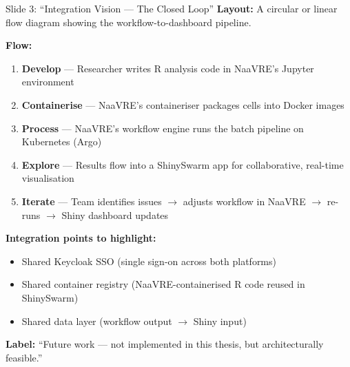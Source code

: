 \documentclass[12pt,a4paper]{article}
\begin{document}
\begin{slidebox}{Slide 3: ``Integration Vision --- The Closed Loop''}
\textbf{Layout:} A circular or linear flow diagram showing the workflow-to-dashboard pipeline.

\textbf{Flow:}
\begin{enumerate}[nosep]
  \item \textbf{Develop} --- Researcher writes R analysis code in NaaVRE's Jupyter environment
  \item \textbf{Containerise} --- NaaVRE's containeriser packages cells into Docker images
  \item \textbf{Process} --- NaaVRE's workflow engine runs the batch pipeline on Kubernetes (Argo)
  \item \textbf{Explore} --- Results flow into a ShinySwarm app for collaborative, real-time visualisation
  \item \textbf{Iterate} --- Team identifies issues $\rightarrow$ adjusts workflow in NaaVRE $\rightarrow$ re-runs $\rightarrow$ Shiny dashboard updates
\end{enumerate}

\textbf{Integration points to highlight:}
\begin{itemize}[nosep]
  \item Shared Keycloak SSO (single sign-on across both platforms)
  \item Shared container registry (NaaVRE-containerised R code reused in ShinySwarm)
  \item Shared data layer (workflow output $\rightarrow$ Shiny input)
\end{itemize}

\textbf{Label:} ``Future work --- not implemented in this thesis, but architecturally feasible.''
\end{slidebox}
\end{document}
